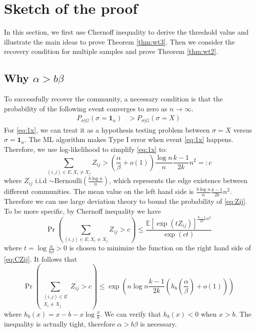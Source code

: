 \documentclass[conference]{IEEEtran}
\begin{document}
\section{Sketch of the proof}
\label{sect:sketch}

In this section, we first use Chernoff inequality to derive the threshold value and illustrate the main ideas to prove Theorem \ref{thm:wt3}.
Then we consider the recovery condition for multiple samples and prove Theorem \ref{thm:wt2}.

\subsection{Why $\alpha > b \beta$}
To successfully recover the community, a necessary condition is that the probability of the following event converges to zero as $n\to\infty$.
\begin{align}
P_{\sigma | G}(\sigma =  \mathbf{1}_n) & > P_{\sigma | G}(\sigma = X) \label{eq:1x}
\end{align}
For \eqref{eq:1x}, we can treat it as a hypothesis testing problem between $\sigma = X$ versus $\sigma = \mathbf{1}_n$.
The ML algorithm makes Type I error when event \eqref{eq:1x} happens. Therefore, we use log-likelihood to simplify
\eqref{eq:1x} to:
\begin{equation}\label{eq:Zij}
\sum_{(i,j)\in E, X_i \neq X_j} Z_{ij} > (\frac{\alpha}{\beta} + o(1)) \frac{\log n}{n} \frac{k-1}{2k}n^2 =: c
\end{equation}
where $Z_{ij}$ i.i.d $\sim \textrm{Bernoulli}(\frac{b\log n }{n})$, which represents the edge existence between different communities. The mean value on the left hand side is $\frac{b \log n }{n} \frac{k-1}{2k}n^2$. Therefore we can use large
deviation theory to bound the probability of \eqref{eq:Zij}. To be more specific, by Chernoff inequality we have
\begin{equation}\label{eq:CZij}
\Pr\left(\sum_{(i,j)\in E, X_i \neq X_j} Z_{ij} >  c \right)\leq \frac{\mathbb{E}[\exp(t Z_{ij})]^{ \frac{k-1}{2k}n^2 }}{\exp(ct)}
\end{equation}
where $ t  = \log \frac{\alpha}{b\beta} > 0$ is chosen to minimize the function on the right hand side of \eqref{eq:CZij}. It follows that
\begin{equation}\label{eq:nlogn}
\Pr(\sum_{\substack{(i,j)\in E \\ X_i \neq X_j}} Z_{ij} >  c )\leq \exp(n\log n  \frac{k-1}{2k} (h_b(\frac{\alpha}{\beta}) + o(1)))
\end{equation}
where $h_b(x) = x - b - x \log\frac{x}{b}$. We can verify that $h_b(x) < 0 $ when $ x > b$. The inequality is actually tight,
therefore $\alpha > b \beta$
is necessary.
\end{document}
